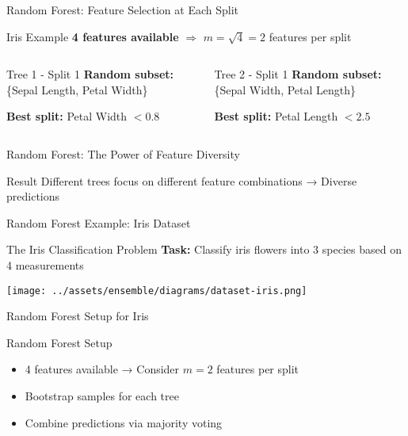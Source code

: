 \documentclass[10pt]{beamer}
\newcommand{\fitpic}[1]{\begin{adjustbox}{max width=\linewidth, max totalheight=0.78\textheight}#1\end{adjustbox}}
\begin{document}
\begin{frame}{Random Forest: Feature Selection at Each Split}
\begin{examplebox}{Iris Example}
\textbf{4 features available} $\Rightarrow$ $m = \sqrt{4} = 2$ features per split
\end{examplebox}

\begin{columns}
\begin{column}{0.48\textwidth}
\begin{definitionbox}{Tree 1 - Split 1}
\textbf{Random subset:} \{Sepal Length, Petal Width\}

\textbf{Best split:} Petal Width $< 0.8$
\end{definitionbox}
\end{column}

\begin{column}{0.48\textwidth}
\begin{definitionbox}{Tree 2 - Split 1}
\textbf{Random subset:} \{Sepal Width, Petal Length\}

\textbf{Best split:} Petal Length $< 2.5$
\end{definitionbox}
\end{column}
\end{columns}
\end{frame}

\begin{frame}{Random Forest: The Power of Feature Diversity}
\begin{keypointsbox}{Result}
Different trees focus on different feature combinations → Diverse predictions
\end{keypointsbox}
\end{frame}

\begin{frame}{Random Forest Example: Iris Dataset}
\begin{examplebox}{The Iris Classification Problem}
\textbf{Task:} Classify iris flowers into 3 species based on 4 measurements
\end{examplebox}

  \vspace{0.3cm}
  \centering
  \fitpic{\texttt{[image: ../assets/ensemble/diagrams/dataset-iris.png]}}
\end{frame}

\begin{frame}{Random Forest Setup for Iris}
\begin{keypointsbox}{Random Forest Setup}
\begin{itemize}
\item 4 features available → Consider $m = 2$ features per split
\item Bootstrap samples for each tree
\item Combine predictions via majority voting
\end{itemize}
\end{keypointsbox}
\end{frame}
\end{document}
